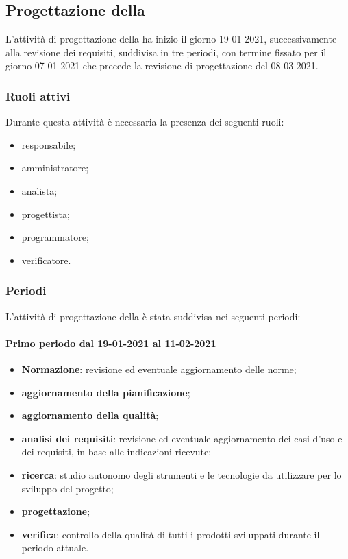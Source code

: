 \newpage 

\subsection{Progettazione della } 
L'attività di progettazione della  ha inizio il giorno 19-01-2021, successivamente alla revisione dei requisiti, suddivisa in tre periodi, con termine fissato per il giorno 07-01-2021 che precede la revisione di progettazione del 08-03-2021. 

\subsubsection{Ruoli attivi} 
Durante questa attività è necessaria la presenza dei seguenti ruoli: 
\begin{itemize} 
	\item responsabile; 
	\item amministratore; 
	\item analista; 
	\item progettista; 
	\item programmatore; 
	\item verificatore.
\end{itemize} 

\subsubsection{Periodi} 
L'attività di progettazione della  è stata suddivisa nei seguenti periodi: 

\paragraph{Primo periodo dal 19-01-2021 al 11-02-2021} 
\begin{itemize} 
	\item \textbf{Normazione}: revisione ed eventuale aggiornamento delle norme; 
	\item \textbf{aggiornamento della pianificazione}; 
	\item \textbf{aggiornamento della qualità}; 
	\item \textbf{analisi dei requisiti}: revisione ed eventuale aggiornamento dei casi d’uso e dei requisiti, in base alle indicazioni ricevute; 
	\item \textbf{ricerca}: studio autonomo degli strumenti e le tecnologie da utilizzare per lo sviluppo del 
	progetto; 
	\item \textbf{progettazione}; 
	\item \textbf{verifica}: controllo della qualità di tutti i prodotti sviluppati durante il periodo attuale. 
\end{itemize} 

